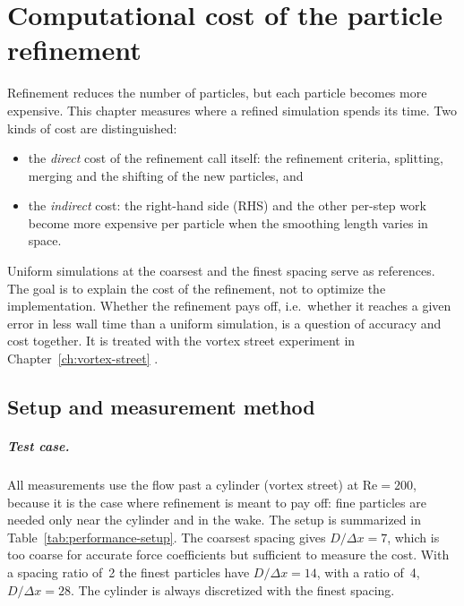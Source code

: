
\chapter{Computational cost of the particle refinement}
\label{ch:performance}


Refinement reduces the number of particles, but each particle becomes more expensive.
This chapter measures where a refined simulation spends its time. Two kinds of cost
are distinguished:
\begin{itemize}
  \item the \emph{direct} cost of the refinement call itself: the refinement criteria,
        splitting, merging and the shifting of the new particles, and
  \item the \emph{indirect} cost: the right-hand side (RHS) and the other per-step work
        become more expensive per particle when the smoothing length varies in space.
\end{itemize}
Uniform simulations at the coarsest and the finest spacing serve as references. The goal is
to explain the cost of the refinement, not to optimize the implementation. Whether the
refinement pays off, i.e.\ whether it reaches a given error in less wall time than a
uniform simulation, is a question of accuracy and cost together. It is treated with the
vortex street experiment in Chapter~\ref{ch:vortex-street}
.

\section{Setup and measurement method}
\label{sec:performance-method}

\paragraph{Test case.}
All measurements use the flow past a cylinder (vortex street) at $\mathrm{Re} = 200$,
because it is the case where refinement is meant to pay off: fine particles are needed
only near the cylinder and in the wake. The setup is summarized in
Table~\ref{tab:performance-setup}. The coarsest spacing gives $D/\Delta x = 7$, which
is too coarse for accurate force coefficients but sufficient to measure the cost. With a
spacing ratio of~2 the finest particles have $D/\Delta x = 14$, with a ratio of~4,
$D/\Delta x = 28$. The cylinder is always discretized with the finest spacing.

